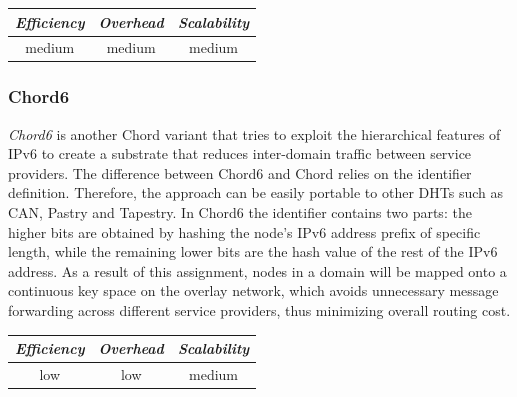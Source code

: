 \begin{center}
\begin{tabular}{ccc}
\emph{Efficiency} & \emph{Overhead} & \emph{Scalability} \\
\hline
medium &
medium &
medium
\end{tabular}
\end{center}

\subsubsection{Chord6}
\emph{Chord6} \cite{XZHL2005} is another Chord variant that tries to
exploit the hierarchical features of IPv6 to create a substrate that
reduces inter-domain traffic between service providers. The difference between
Chord6 and Chord relies on the identifier definition. Therefore, the approach
can be easily portable to other DHTs such as CAN, Pastry and Tapestry. In Chord6
the identifier contains two parts: the higher bits are obtained by hashing the
node's IPv6 address prefix of specific length, while the remaining lower bits
are the hash value of the rest of the IPv6 address. As a result of this
assignment, nodes in a domain will be mapped onto a continuous key space on the
overlay network, which avoids unnecessary message forwarding across different
service providers, thus minimizing overall routing cost.

\begin{center}
\begin{tabular}{ccc}
\emph{Efficiency} & \emph{Overhead} & \emph{Scalability} \\
\hline
low &
low &
medium
\end{tabular}
\end{center}

